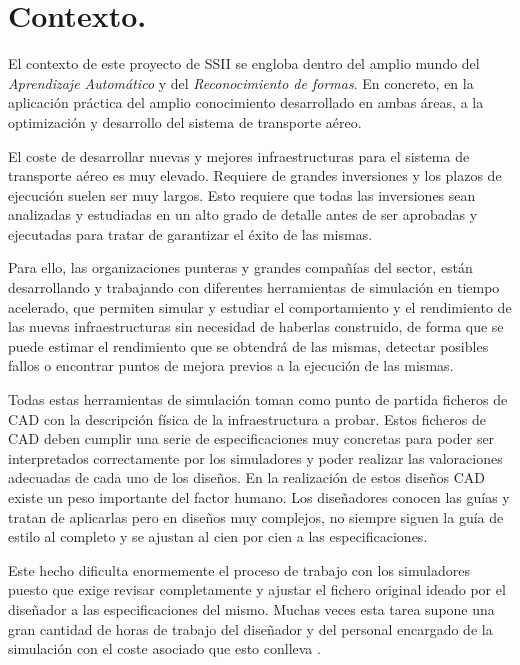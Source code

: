 \section{Contexto.}

El contexto de este proyecto de SSII se engloba dentro del amplio mundo del \textit{Aprendizaje Automático} y del \textit{Reconocimiento de formas}. En concreto, en la aplicación práctica del amplio conocimiento desarrollado en ambas áreas, a la optimización y desarrollo del sistema de transporte aéreo.

El coste de desarrollar nuevas y mejores infraestructuras para el sistema de transporte aéreo es muy elevado. Requiere de grandes inversiones y los plazos de ejecución suelen ser muy largos. Esto requiere que todas las inversiones sean analizadas y estudiadas en un alto grado de detalle antes de ser aprobadas y ejecutadas para tratar de garantizar el éxito de las mismas.

Para ello, las organizaciones punteras y grandes compañías del sector, están desarrollando y trabajando con diferentes herramientas de simulación en tiempo acelerado, que permiten simular y estudiar el comportamiento y el rendimiento de las nuevas infraestructuras sin necesidad de haberlas construido, de forma que se puede estimar el rendimiento que se obtendrá de las mismas, detectar posibles fallos o encontrar puntos de mejora previos a la ejecución de las mismas.

Todas estas herramientas de simulación toman como punto de partida ficheros de CAD \cite{CAD} con la descripción física de la infraestructura a probar. Estos ficheros de CAD deben cumplir una serie de especificaciones muy concretas para poder ser interpretados correctamente por los simuladores y poder realizar las valoraciones adecuadas de cada uno de los diseños. En la realización de estos diseños CAD existe un peso importante del factor humano. Los diseñadores conocen las guías y tratan de aplicarlas pero en diseños muy complejos, no siempre siguen la guía de estilo al completo y se ajustan al cien por cien a las especificaciones. 

Este hecho dificulta enormemente el proceso de trabajo con los simuladores puesto que exige revisar completamente y ajustar el fichero original ideado por el diseñador a las especificaciones del mismo. Muchas veces esta tarea supone una gran cantidad de horas de trabajo del diseñador y del personal encargado de la simulación con el coste asociado que esto conlleva \cite{Mariscal-2005}.

